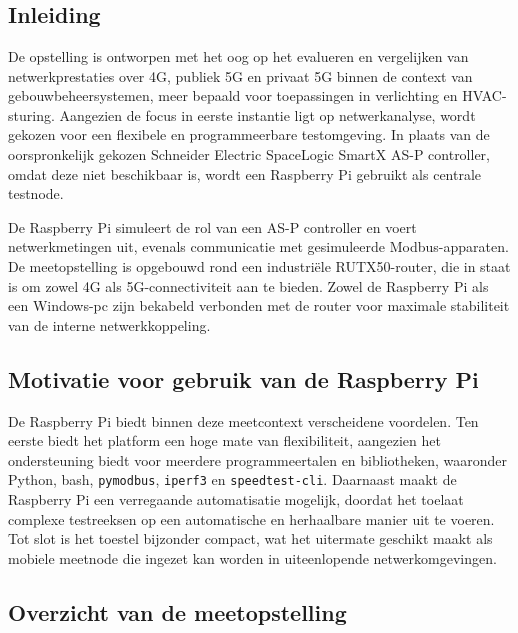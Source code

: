 \chapter{}%
\label{ch:basisopstelling}

\section{Inleiding}

De opstelling is ontworpen met het oog op het evalueren en vergelijken van netwerkprestaties over 4G, publiek 5G en privaat 5G binnen de context van gebouwbeheersystemen, meer bepaald voor toepassingen in verlichting en HVAC-sturing. Aangezien de focus in eerste instantie ligt op netwerkanalyse, wordt gekozen voor een flexibele en programmeerbare testomgeving. In plaats van de oorspronkelijk gekozen Schneider Electric SpaceLogic SmartX AS-P controller, omdat deze niet beschikbaar is, wordt een Raspberry Pi gebruikt als centrale testnode.

De Raspberry Pi simuleert de rol van een AS-P controller en voert netwerkmetingen uit, evenals communicatie met gesimuleerde Modbus-apparaten. De meetopstelling is opgebouwd rond een industriële RUTX50-router, die in staat is om zowel 4G als 5G-connectiviteit aan te bieden. Zowel de Raspberry Pi als een Windows-pc zijn bekabeld verbonden met de router voor maximale stabiliteit van de interne netwerkkoppeling.

\section{Motivatie voor gebruik van de Raspberry Pi}

De Raspberry Pi biedt binnen deze meetcontext verscheidene voordelen. Ten eerste biedt het platform een hoge mate van flexibiliteit, aangezien het ondersteuning biedt voor meerdere programmeertalen en bibliotheken, waaronder Python, bash, \texttt{pymodbus}, \texttt{iperf3} en \texttt{speedtest-cli}. Daarnaast maakt de Raspberry Pi een verregaande automatisatie mogelijk, doordat het toelaat complexe testreeksen op een automatische en herhaalbare manier uit te voeren. Tot slot is het toestel bijzonder compact, wat het uitermate geschikt maakt als mobiele meetnode die ingezet kan worden in uiteenlopende netwerkomgevingen.


\section{Overzicht van de meetopstelling}


